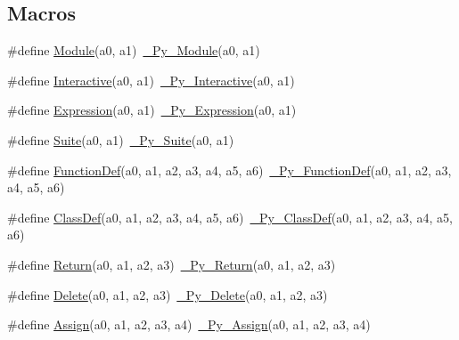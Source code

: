 \subsection*{Macros}
\begin{DoxyCompactItemize}
\item 
\#define \mbox{\hyperlink{_python-ast_8h_a050cb8da9f4ab67bed9b2fa2ae362a41}{Module}}(a0,  a1)~\mbox{\hyperlink{_python-ast_8h_ac22a9146d597c59e94e9511dd4db4772}{\+\_\+\+Py\+\_\+\+Module}}(a0, a1)
\item 
\#define \mbox{\hyperlink{_python-ast_8h_a548fae4933b00e338520d721a85e4160}{Interactive}}(a0,  a1)~\mbox{\hyperlink{_python-ast_8h_a8e15d080424e133f37dcc31ddd99a34b}{\+\_\+\+Py\+\_\+\+Interactive}}(a0, a1)
\item 
\#define \mbox{\hyperlink{_python-ast_8h_a8c5273fe38597ee6607481e31b440f85}{Expression}}(a0,  a1)~\mbox{\hyperlink{_python-ast_8h_a87521a69a46a2f948409cfc6e4a8e8cf}{\+\_\+\+Py\+\_\+\+Expression}}(a0, a1)
\item 
\#define \mbox{\hyperlink{_python-ast_8h_a0463d5ea08f733cdcfa44c9dcaa9b3ed}{Suite}}(a0,  a1)~\mbox{\hyperlink{_python-ast_8h_a7a0cc82ce7beb48bc2e9811f63ce1d9f}{\+\_\+\+Py\+\_\+\+Suite}}(a0, a1)
\item 
\#define \mbox{\hyperlink{_python-ast_8h_a123bf3266f8916d4150c6620533ce429}{Function\+Def}}(a0,  a1,  a2,  a3,  a4,  a5,  a6)~\mbox{\hyperlink{_python-ast_8h_adf3e1a9736a5443058274bcd750304fb}{\+\_\+\+Py\+\_\+\+Function\+Def}}(a0, a1, a2, a3, a4, a5, a6)
\item 
\#define \mbox{\hyperlink{_python-ast_8h_abdc9d5fc24b79057eecd50c7dea3bfdd}{Class\+Def}}(a0,  a1,  a2,  a3,  a4,  a5,  a6)~\mbox{\hyperlink{_python-ast_8h_a4c475d7bf15d3fcf2565d6ed0bbdedad}{\+\_\+\+Py\+\_\+\+Class\+Def}}(a0, a1, a2, a3, a4, a5, a6)
\item 
\#define \mbox{\hyperlink{_python-ast_8h_abdae7f49d66ce8e500825bb53aa14901}{Return}}(a0,  a1,  a2,  a3)~\mbox{\hyperlink{_python-ast_8h_a7119d853ac5d21a0aab782a16be84c6d}{\+\_\+\+Py\+\_\+\+Return}}(a0, a1, a2, a3)
\item 
\#define \mbox{\hyperlink{_python-ast_8h_a7892570e9ff41fd7a083f300e4b81068}{Delete}}(a0,  a1,  a2,  a3)~\mbox{\hyperlink{_python-ast_8h_ad988aab3b2734705a19dcf45a0b98950}{\+\_\+\+Py\+\_\+\+Delete}}(a0, a1, a2, a3)
\item 
\#define \mbox{\hyperlink{_python-ast_8h_a20ef6778f00445938f70621bb6bcc118}{Assign}}(a0,  a1,  a2,  a3,  a4)~\mbox{\hyperlink{_python-ast_8h_ac35a8556d501c8658c9c2439952e50be}{\+\_\+\+Py\+\_\+\+Assign}}(a0, a1, a2, a3, a4)

\end{DoxyCompactItemize}
